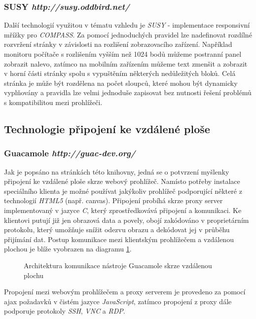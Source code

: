 \subsubsection*{\textbf{SUSY} \hfill \emph{http://susy.oddbird.net/}}
\label{subsec:susy}
Další technologií využitou v tématu vzhledu je \emph{SUSY} - implementace responsivní mřížky pro \emph{COMPASS}. Za pomocí jednoduchých pravidel lze nadefinovat rozdílné rozvržení stránky v závislosti na rozlišení zobrazovacího zařízení. Například monitoru počítače s rozlišením vyšším než 1024 bodů můžeme postranní panel zobrazit nalevo, zatímco na mobilním zařízením můžeme text zmenšit a zobrazit v horní části stránky spolu s vypuštěním některých nedůležitých bloků. Celá stránka je může být rozdělena na počet sloupců, které mohou být dynamicky vyplňovány a pravidla lze velmi jednoduše zapisovat bez nutnosti řešení problémů s kompatibilitou mezi prohlížeči.

\subsection{Technologie připojení ke vzdálené ploše}

\subsubsection*{\textbf{Guacamole} \hfill \emph{http://guac-dev.org/}}
\label{subsec:guacamole}
Jak je popsáno na stránkách této knihovny, jedná se o potvrzení myšlenky připojení ke vzdálené ploše skrze webový prohlížeč. Namísto potřeby instalace speciálního klienta je možné používat jakýkoliv prohlížeč podporující některé z technologií \emph{HTML5} (např. canvas). Připojení probíhá skrze proxy server implementovaný v jazyce \emph{C}, který zprostředkovává připojení a komunikaci. Ke klientovi putují již jen obrazová data a povely, obojí zakódováno v proprietárním protokolu, který umožňuje snížit odezvu obrazu a dekódovat jej v průběhu přijímání dat. Postup komunikace mezi klientským prohlížečem a vzdálenou plochou je blíže vyobrazen na diagramu \ref{fig:arch_core}.

\begin{figure}[htp] 
  \caption{Architektura komunikace nástroje Guacamole skrze vzdálenou plochu}
  \label{fig:arch_core}
\end{figure}  

Propojení mezi webovým prohlížečem a proxy serverem je provedeno za pomocí \gls{ajax} požadavků v čistém jazyce \emph{JavaScript}, zatímco propojení z proxy dále podporuje protokoly \emph{SSH}, \emph{VNC} a \emph{RDP}.


